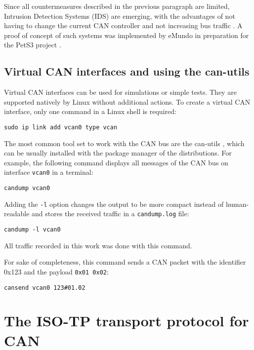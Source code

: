 Since all countermeasures described in the previous paragraph are limited, Intrusion Detection Systems (IDS) are emerging, with the advantages of not having to change the current CAN controller and not increasing bus traffic \cite{Bozdal2020}. A proof of concept of such systems was implemented by eMundo in preparation for the PetS3 project \cite{spahn2018}.

\subsection{Virtual CAN interfaces and using the can-utils}
\label{subsubsec:can-utils}

Virtual CAN interfaces can be used for simulations or simple tests. They are supported natively by Linux without additional actions.
To create a virtual CAN interface, only one command in a Linux shell is required:
\begin{verbatim}
sudo ip link add vcan0 type vcan
\end{verbatim}

The most common tool set to work with the CAN bus are the can-utils \cite{can-utils}, which can be usually installed with the package manager of the distributions. For example, the following command displays all messages of the CAN bus on interface \texttt{vcan0} in a terminal:
\begin{verbatim}
candump vcan0
\end{verbatim}

Adding the \texttt{-l} option changes the output to be more compact instead of human-readable and stores the received traffic in a \texttt{candump.log} file:

\begin{verbatim}
candump -l vcan0
\end{verbatim}

All traffic recorded in this work was done with this command.

For sake of completeness, this command sends a CAN packet with the identifier 0x123 and the payload \texttt{0x01 0x02}:
\begin{verbatim}
cansend vcan0 123#01.02
\end{verbatim}

\section{The ISO-TP transport protocol for CAN}

